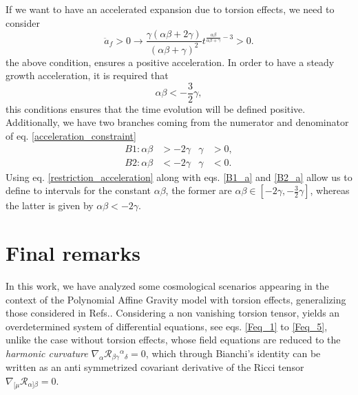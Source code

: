 \documentclass{article}
\begin{document}
If we want to have an accelerated expansion due to torsion effects, we need to consider
\begin{equation}
    \label{acceleration_constraint}
    \ddot{a}_f > 0 \to \frac{\gamma\left(\alpha\beta + 2\gamma\right)}{\left(\alpha\beta + \gamma\right)^2}t^{\frac{\alpha\beta}{\alpha\beta + \gamma} - 3} > 0.
\end{equation}
the above condition, ensures a positive acceleration. In order to have a steady growth acceleration, it is required that 
\begin{equation}
    \label{restriction_acceleration}
    \alpha\beta < -\frac{3}{2}\gamma, 
\end{equation}
this conditions ensures that the time evolution will be defined positive. Additionally, we have two branches coming from 
the numerator and denominator of eq. \eqref{acceleration_constraint}
\begin{align}
    B1: \alpha\beta & > -2\gamma & \gamma & > 0, \label{B1_a} \\
    B2: \alpha\beta & < -2\gamma & \gamma & < 0. \label{B2_a}
\end{align}
Using eq. \eqref{restriction_acceleration} along with eqs. \eqref{B1_a} and \eqref{B2_a} allow us to define to intervals for the
constant $\alpha\beta$, the former are $\alpha\beta \in \left[-2\gamma, -\frac{3}{2}\gamma\right]$, 
whereas the latter is given by $\alpha\beta <-2\gamma$. 

\section{Final remarks}
\label{sec:final_remarks}

In this work, we have analyzed some cosmological scenarios appearing in the context of the 
Polynomial Affine Gravity model with torsion effects, generalizing those considered in 
Refs.\cite{castillofelisola2019cosmological,Castillo_Felisola_2020}. Considering a non 
vanishing torsion tensor, yields an overdetermined system of differential equations, 
see eqs. \eqref{Feq_1} to \eqref{Feq_5}, unlike the case without torsion effects, whose
field equations are reduced to the \textit{harmonic curvature} $\nabla_\alpha 
\mathcal{R}_{\beta\gamma}{}^{\alpha}{}_{\delta} = 0$, which through Bianchi's identity 
can be written as an anti symmetrized covariant derivative of the Ricci tensor $\nabla_{[\mu} 
\mathcal{R}_{\alpha]\beta} = 0$.
\end{document}

